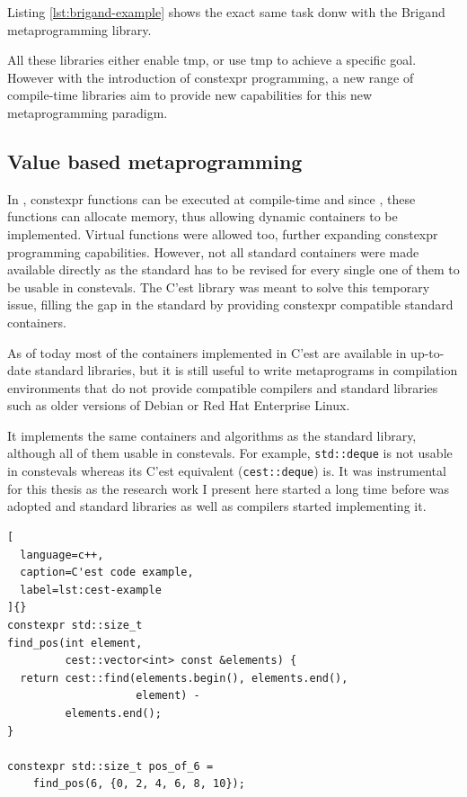 \documentclass[../main]{subfiles}
\begin{document}
Listing \ref{lst:brigand-example} shows the exact same task donw with the
Brigand metaprogramming library.

All these libraries either enable \gls{tmp}, or use \gls{tmp} to achieve
a specific goal. However with the introduction of \gls{constexpr} programming,
a new range of compile-time libraries aim to provide new capabilities
for this new metaprogramming paradigm.

\subsection{
  Value based metaprogramming
}

In \cpp, \gls{constexpr} functions can be executed at compile-time and since
, these functions can allocate memory, thus allowing dynamic containers
to be implemented. Virtual functions were allowed too, further expanding
\gls{constexpr} programming capabilities.
However, not all standard containers were made available directly as
the standard has to be revised for every single one of them to be
usable in \glspl{consteval}. The C'est \cite{cest} library was meant to solve
this temporary issue, filling the gap in the \cpp standard by providing
\gls{constexpr} compatible standard containers.

As of today most of the containers implemented in C'est are available in
up-to-date standard libraries, but it is still useful to write metaprograms
in compilation environments that do not provide  compatible compilers
and standard libraries such as older versions of Debian
or Red Hat Enterprise Linux.

It implements the same containers and algorithms as the \cpp standard library,
although all of them usable in \glspl{consteval}. For example,
\lstinline{std::deque} is not usable in \glspl{consteval} whereas
its C'est equivalent (\lstinline{cest::deque}) is.
It was instrumental for this thesis as the research work I present here started
a long time before  was adopted and standard libraries as well as
compilers started implementing it.

\begin{lstlisting}[
  language=c++,
  caption=C'est code example,
  label=lst:cest-example
]{}
constexpr std::size_t
find_pos(int element,
         cest::vector<int> const &elements) {
  return cest::find(elements.begin(), elements.end(),
                    element) -
         elements.end();
}

constexpr std::size_t pos_of_6 =
    find_pos(6, {0, 2, 4, 6, 8, 10});
\end{lstlisting}
\end{document}
